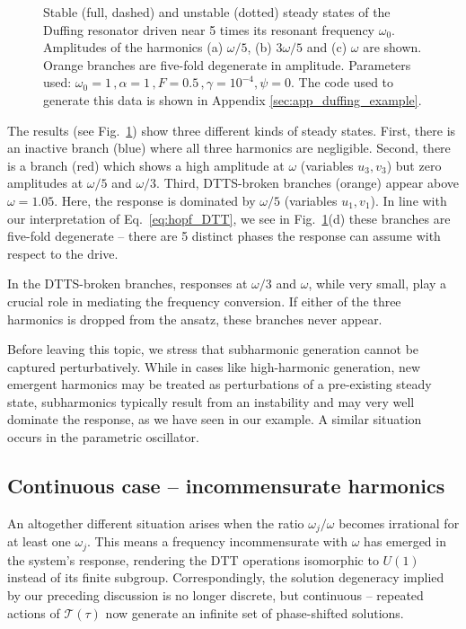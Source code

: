 \begin{figure}[h!]
	\centering
	
	\caption{Stable (full, dashed) and unstable (dotted) steady states of the Duffing resonator driven near 5 times its resonant frequency $\omega_0$. Amplitudes of the harmonics (a) $\omega/5$, (b) $3\omega /5$ and (c) $\omega$ are shown. Orange branches are five-fold degenerate in amplitude. Parameters used: $\omega_0 = 1 \,, \alpha = 1 \,, F = 0.5 \,, \gamma = 10^{-4}, \psi=0$. The code used to generate this data is shown in Appendix \ref{sec:app_duffing_example}.}
	\label{fig:hb_duff_sub}
\end{figure}

The results (see Fig.~\ref{fig:hb_duff_sub}) show three different kinds of steady states. First, there is an inactive branch (blue) where all three harmonics are negligible. Second, there is a branch (red) which shows a high amplitude at $\omega$ (variables $u_3, v_3$) but zero amplitudes at $\omega/5$ and $\omega/3$. 
Third, DTTS-broken branches (orange) appear above $\omega=1.05$. Here, the response is dominated by $\omega/5$ (variables $u_1, v_1$).  
In line with our interpretation of Eq.~\eqref{eq:hopf_DTT}, we see in Fig.~\ref{fig:hb_duff_sub}(d) these branches are five-fold degenerate -- there are 5 distinct phases the response can assume with respect to the drive.

In the DTTS-broken branches, responses at $\omega/3$ and $\omega$, while very small, play a crucial role in mediating the frequency conversion. If either of the three harmonics is dropped from the ansatz, these branches never appear. 

Before leaving this topic, we stress that subharmonic generation cannot be captured perturbatively. While in cases like high-harmonic generation, new emergent harmonics may be treated as perturbations of a pre-existing steady state, subharmonics typically result from an instability and may very well dominate the response, as we have seen in our example. A similar situation occurs in the parametric oscillator. 

\subsection{Continuous case -- incommensurate harmonics} 

An altogether different situation arises when the ratio $\omega_j / \omega$ becomes irrational for at least one $\omega_j$. This means a frequency incommensurate with $\omega$ has emerged in the system's response, rendering the DTT operations isomorphic to $U(1)$ instead of its finite subgroup. Correspondingly, the solution degeneracy implied by our preceding discussion is no longer discrete, but continuous -- repeated actions of $\mathcal{T}(\tau)$ now generate an infinite set of phase-shifted solutions. 

